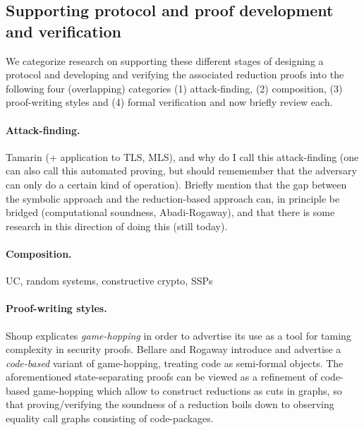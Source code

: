 \subsection{Supporting protocol and proof development and verification}
We categorize research on supporting these different stages of designing a protocol and developing and verifying the associated reduction proofs into the following four (overlapping) categories (1) attack-finding, (2) composition, (3) proof-writing styles and (4) formal verification and now briefly review each.

{\color{blue}
\paragraph{Attack-finding.} Tamarin (+ application to TLS, MLS), and why do I call this attack-finding (one can also call this automated proving, but should rememember that the adversary can only do a certain kind of operation). Briefly mention that the gap between the symbolic approach and the reduction-based approach can, in principle be bridged (computational soundness, Abadi-Rogaway), and that there is some research in this direction of doing this (still today).

\paragraph{Composition.} UC, random systems, constructive crypto, SSPs}

\paragraph{Proof-writing styles.}
Shoup explicates \emph{game-hopping} in order to advertise its use as a tool for taming complexity in security proofs. 
Bellare and Rogaway introduce and advertise a \emph{code-based} variant of
game-hopping, treating code as semi-formal objects. 
The aforementioned state-separating proofs can be viewed as a refinement of code-based game-hopping which allow to construct reductions as cuts in graphs, so that proving/verifying the soundness of a reduction boils down to observing equality call graphs consisting of code-packages.

